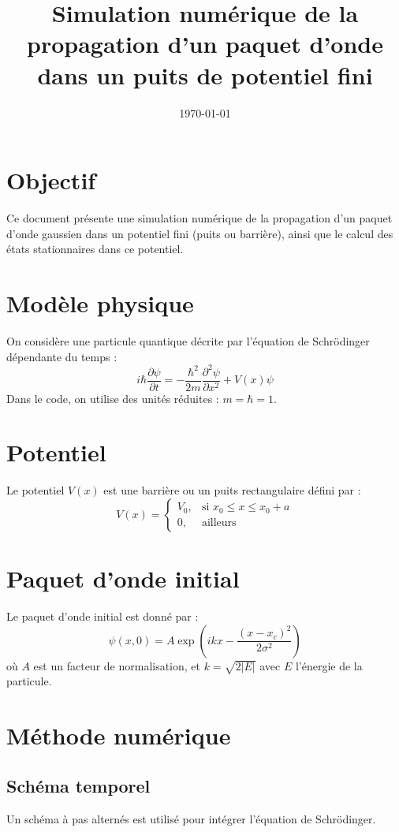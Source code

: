 \documentclass[11pt]{article}
\title{Simulation numérique de la propagation d'un paquet d'onde dans un puits de potentiel fini}
\date{\today}
\begin{document}
\maketitle

\section*{Objectif}
Ce document présente une simulation numérique de la propagation d’un paquet d’onde gaussien dans un potentiel fini (puits ou barrière), ainsi que le calcul des états stationnaires dans ce potentiel.

\section*{Modèle physique}
On considère une particule quantique décrite par l'équation de Schrödinger dépendante du temps :
\[
i \hbar \frac{\partial \psi}{\partial t} = -\frac{\hbar^2}{2m} \frac{\partial^2 \psi}{\partial x^2} + V(x)\psi
\]
Dans le code, on utilise des unités réduites : $m = \hbar = 1$.

\section*{Potentiel}
Le potentiel $V(x)$ est une barrière ou un puits rectangulaire défini par :
\[
V(x) =
\begin{cases}
V_0, & \text{si } x_0 \leq x \leq x_0 + a \\
0, & \text{ailleurs}
\end{cases}
\]

\section*{Paquet d’onde initial}
Le paquet d’onde initial est donné par :
\[
\psi(x, 0) = A \exp\left(i k x - \frac{(x - x_c)^2}{2\sigma^2} \right)
\]
où $A$ est un facteur de normalisation, et $k = \sqrt{2|E|}$ avec $E$ l'énergie de la particule.

\section*{Méthode numérique}
\subsection*{Schéma temporel}
Un schéma à pas alternés est utilisé pour intégrer l'équation de Schrödinger.
\end{document}
